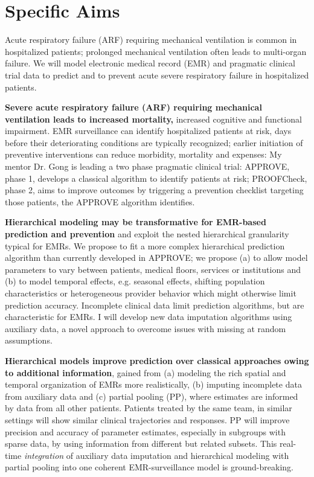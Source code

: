 \documentclass[11pt,notitlepage]{article}
\begin{document}
\part*{Specific Aims}
Acute respiratory failure (ARF) requiring mechanical ventilation is common in hospitalized patients; prolonged mechanical ventilation often leads to multi-organ failure. We will model electronic medical record (EMR) and pragmatic clinical trial data to predict and to prevent acute severe respiratory failure in hospitalized patients.

\textbf{Severe acute respiratory failure (ARF) requiring mechanical ventilation leads to increased mortality,} increased cognitive and functional impairment. EMR surveillance can identify hospitalized patients at risk, days before their deteriorating conditions are typically recognized; earlier initiation of preventive interventions can reduce morbidity, mortality and expenses: My mentor Dr. Gong is leading a two phase pragmatic clinical trial: APPROVE, phase 1, develops a classical algorithm to identify patients at risk; PROOFCheck, phase 2, aims to improve outcomes by triggering a prevention checklist targeting those patients, the APPROVE algorithm identifies. 

\textbf{Hierarchical modeling may be transformative for EMR-based prediction and prevention} and exploit the nested hierarchical granularity typical for EMRs. We propose to fit a more complex hierarchical prediction algorithm than currently developed in APPROVE; we propose (a) to allow model parameters to vary between patients, medical floors, services or institutions and (b) to model temporal effects, e.g. seasonal effects, shifting population characteristics or heterogeneous provider behavior which might otherwise limit prediction accuracy. Incomplete clinical data limit prediction algorithms, but are characteristic for EMRs. I will develop new data imputation algorithms using auxiliary data, a novel approach to overcome issues with missing at random assumptions. 

\textbf{Hierarchical models improve prediction over classical approaches owing to additional information}, gained from (a) modeling the rich spatial and temporal organization of EMRs more realistically, (b) imputing incomplete data from auxiliary data and (c) partial pooling (PP), where estimates are informed by data from all other patients. Patients treated by the same team, in similar settings will show similar clinical trajectories and responses. PP will improve precision and accuracy of parameter estimates, especially in subgroups with sparse data, by using information from different but related subsets. This real-time \textit{integration} of auxiliary data imputation and hierarchical modeling with partial pooling into one coherent EMR-surveillance model is ground-breaking. 
\end{document}
